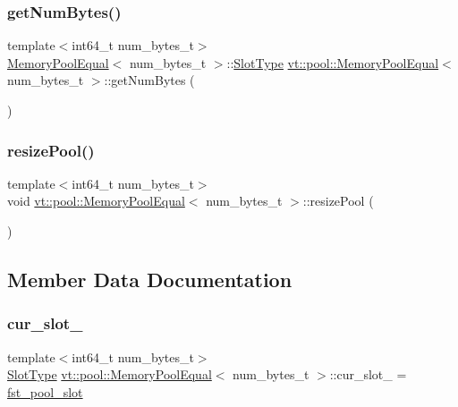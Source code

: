 \subsubsection{\texorpdfstring{get\+Num\+Bytes()}{getNumBytes()}}
{\footnotesize\ttfamily template$<$int64\+\_\+t num\+\_\+bytes\+\_\+t$>$ \\
\hyperlink{structvt_1_1pool_1_1_memory_pool_equal}{Memory\+Pool\+Equal}$<$ num\+\_\+bytes\+\_\+t $>$\+::\hyperlink{structvt_1_1pool_1_1_memory_pool_equal_a101fdcb943d0cb0863cf17655e0b4e1c}{Slot\+Type} \hyperlink{structvt_1_1pool_1_1_memory_pool_equal}{vt\+::pool\+::\+Memory\+Pool\+Equal}$<$ num\+\_\+bytes\+\_\+t $>$\+::get\+Num\+Bytes (\begin{DoxyParamCaption}{ }\end{DoxyParamCaption})}

\mbox{\label{structvt_1_1pool_1_1_memory_pool_equal_acb03d02014eaebd24522525b059d4fb4}} 
\subsubsection{\texorpdfstring{resize\+Pool()}{resizePool()}}
{\footnotesize\ttfamily template$<$int64\+\_\+t num\+\_\+bytes\+\_\+t$>$ \\
void \hyperlink{structvt_1_1pool_1_1_memory_pool_equal}{vt\+::pool\+::\+Memory\+Pool\+Equal}$<$ num\+\_\+bytes\+\_\+t $>$\+::resize\+Pool (\begin{DoxyParamCaption}{ }\end{DoxyParamCaption})}



\subsection{Member Data Documentation}
\mbox{\label{structvt_1_1pool_1_1_memory_pool_equal_aa9298df54e6a541e9dd8960befbf46a5}} 
\subsubsection{\texorpdfstring{cur\+\_\+slot\+\_\+}{cur\_slot\_}}
{\footnotesize\ttfamily template$<$int64\+\_\+t num\+\_\+bytes\+\_\+t$>$ \\
\hyperlink{structvt_1_1pool_1_1_memory_pool_equal_a101fdcb943d0cb0863cf17655e0b4e1c}{Slot\+Type} \hyperlink{structvt_1_1pool_1_1_memory_pool_equal}{vt\+::pool\+::\+Memory\+Pool\+Equal}$<$ num\+\_\+bytes\+\_\+t $>$\+::cur\+\_\+slot\+\_\+ = \hyperlink{structvt_1_1pool_1_1_memory_pool_equal_ae0435baf515fefccc015b600357bc6bb}{fst\+\_\+pool\+\_\+slot}\hspace{0.3cm}{\ttfamily [private]}}


